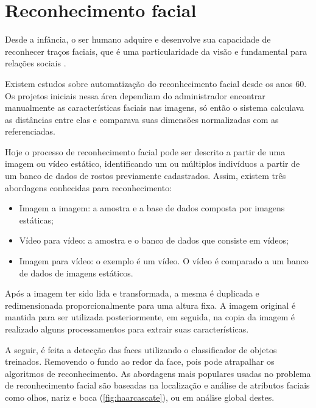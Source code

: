 \section{Reconhecimento facial}\label{sec:reconhecimento}

Desde a infância, o ser humano adquire e desenvolve sua capacidade de reconhecer traços faciais, 
que é uma particularidade da visão e fundamental para relações sociais \cite{rouhani2019}.

Existem estudos sobre automatização do reconhecimento facial desde os anos 60. Os projetos iniciais nessa 
área dependiam do administrador encontrar manualmente as características faciais nas imagens, só 
então o sistema calculava as distâncias entre elas e comparava suas dimensões normalizadas com 
as referenciadas.

Hoje o processo de reconhecimento facial pode ser descrito a partir de uma imagem ou vídeo estático, 
identificando um ou múltiplos indivíduos a partir de um banco de dados de rostos previamente 
cadastrados. Assim, existem três abordagens conhecidas para reconhecimento:

\begin{itemize}
    \item Imagem a imagem: a amostra e a base de dados composta por imagens estáticas;

    \item Vídeo para vídeo: a amostra e o banco de dados que consiste em vídeos;

    \item Imagem para vídeo: o exemplo é um vídeo. O vídeo é comparado a um banco de 
    dados de imagens estáticos. 
\end{itemize}

Após a imagem ter sido lida e transformada, a mesma é duplicada e redimensionada 
proporcionalmente para uma altura fixa. A imagem original é mantida para ser 
utilizada posteriormente, em seguida, na copia da imagem é realizado alguns 
processamentos para extrair suas características.

A seguir, é feita a detecção das faces utilizando o classificador 
de objetos treinados. Removendo o fundo ao redor da face, pois 
pode atrapalhar os algoritmos de reconhecimento. As abordagens mais 
populares usadas no problema de reconhecimento facial são 
baseadas na localização e análise de atributos faciais como olhos, nariz e 
boca (\autoref{fig:haarcascate}), ou em análise global destes.

